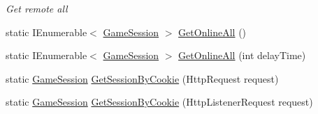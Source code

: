 \begin{DoxyCompactItemize}
\begin{DoxyCompactList}\small\item\em Get remote all \end{DoxyCompactList}\item 
static I\+Enumerable$<$ \mbox{\hyperlink{class_t_net_1_1_contract_1_1_game_session}{Game\+Session}} $>$ \mbox{\hyperlink{class_t_net_1_1_contract_1_1_game_session_aab7cf66a8f8f6ef04984e841e687dc39}{Get\+Online\+All}} ()
\item 
static I\+Enumerable$<$ \mbox{\hyperlink{class_t_net_1_1_contract_1_1_game_session}{Game\+Session}} $>$ \mbox{\hyperlink{class_t_net_1_1_contract_1_1_game_session_a51a967642069f84b731ac6445bf57c94}{Get\+Online\+All}} (int delay\+Time)
\item 
static \mbox{\hyperlink{class_t_net_1_1_contract_1_1_game_session}{Game\+Session}} \mbox{\hyperlink{class_t_net_1_1_contract_1_1_game_session_a078671e511ff0dac6876d5276debd67c}{Get\+Session\+By\+Cookie}} (Http\+Request request)
\item 
static \mbox{\hyperlink{class_t_net_1_1_contract_1_1_game_session}{Game\+Session}} \mbox{\hyperlink{class_t_net_1_1_contract_1_1_game_session_a91b4ed06efebff3da2bb64742e0fb678}{Get\+Session\+By\+Cookie}} (Http\+Listener\+Request request)
\end{DoxyCompactItemize}
